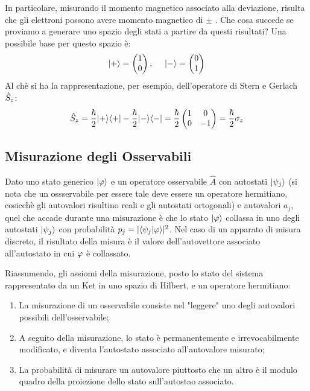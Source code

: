 In particolare, misurando il momento magnetico associato alla deviazione, risulta che gli elettroni possono avere momento magnetico di $\pm$ \thhalf. Che cosa succede se proviamo a generare uno spazio degli stati a partire da questi risultati?
Una possibile base per questo spazio è:
\[
	|+\rangle = \begin{pmatrix} 1 \\ 0 \end{pmatrix}, \ \ \ \ |-\rangle = \begin{pmatrix} 0 \\ 1 \end{pmatrix}
\]
Al chè si ha la rappresentazione, per esempio, dell'operatore di Stern e Gerlach $\hat{S}_{z}$:
\[
	\hat S_z = \frac{\hslash}{2} |+\rangle \langle +| - \frac{\hslash}{2} |-\rangle \langle -| = \frac{\hslash}{2} \begin{pmatrix} 1 & 0 \\ 0 & -1 \end{pmatrix} = \frac{\hslash}{2} \sigma_z
\]

\subsection{Misurazione degli Osservabili}
Dato uno stato generico $|\varphi \rangle$ e un operatore osservabile $\hat A$ con autostati $|\psi_j \rangle$ (si nota che un ossservabile per essere tale deve essere un operatore hermitiano, cosicchè gli autovalori risultino reali e gli autostati ortogonali) e autovalori $a_j$, quel che accade durante una misurazione è che lo stato $|\varphi \rangle$ collassa in uno degli autostati $|\psi_j \rangle$ con probabilità $p_j = |\langle \psi_j | \varphi \rangle|^2$. Nel caso di un apparato di misura discreto, il risultato della misura è il valore dell'autovettore associato all'autostato in cui $\varphi$ è collassato.

Riassumendo, gli assiomi della misurazione, posto lo stato del sistema rappresentato da un Ket in uno spazio di Hilbert, e un operatore hermitiano:
\begin{enumerate}
	\item La misurazione di un osservabile consiste nel "leggere" uno degli autovalori possibili dell'osservabile;
	\item A seguito della misurazione, lo stato è permanentemente e irrevocabilmente modificato, e diventa l'autostato associato all'autovalore misurato;
	\item La probabilità di misurare un autovalore piuttosto che un altro è il modulo quadro della proiezione dello stato sull'autostao associato.
\end{enumerate}

